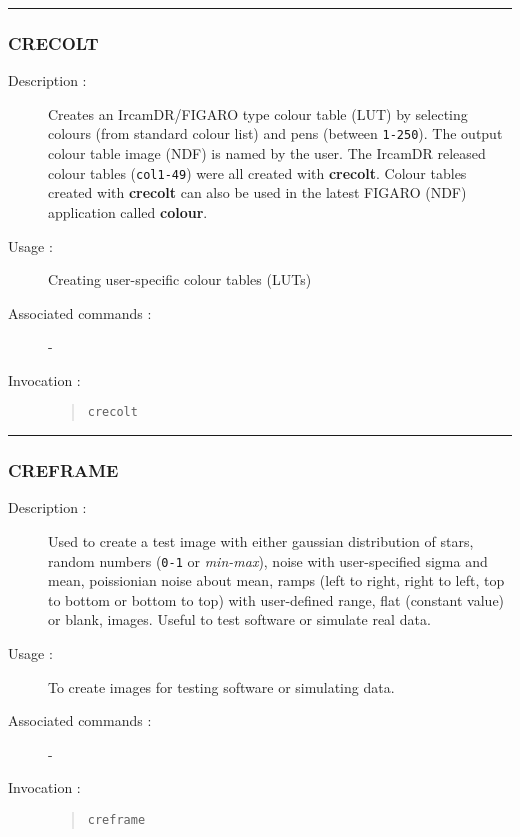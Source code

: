 \hrule 
\subsubsection*{\label{CRECOLT}CRECOLT}

\begin{description}

\item[Description :] Creates an {\sc IrcamDR}/FIGARO type colour table
(LUT) by selecting colours (from standard colour list) and pens
(between {\tt 1-250}).  The output colour table image (NDF) is named by
the user.  The {\sc IrcamDR} released colour tables ({\tt col1-49})
were all created with {\bf crecolt}.  Colour tables created with {\bf
crecolt} can also be used in the latest FIGARO (NDF) application called
{\bf colour}.

\item[Usage :] Creating user-specific colour tables (LUTs)
\item[Associated commands :] -
\item[Invocation :]

\begin{quote}{\tt  crecolt }\end{quote}

\end{description}

\hrule 
\subsubsection*{\label{CREFRAME}CREFRAME}

\begin{description}

\item[Description :] Used to create a test image with either gaussian
distribution of stars, random numbers ({\tt 0-1} or {\it min-max}),
noise with user-specified sigma and mean, poissionian noise about mean,
ramps (left to right, right to left, top to bottom or bottom to top)
with user-defined range, flat (constant value) or blank, images.
Useful to test software or simulate real data.

\item[Usage :] To create images for testing software or simulating data.
\item[Associated commands :] -
\item[Invocation :]

\begin{quote}{\tt  creframe }\end{quote}

\end{description}

